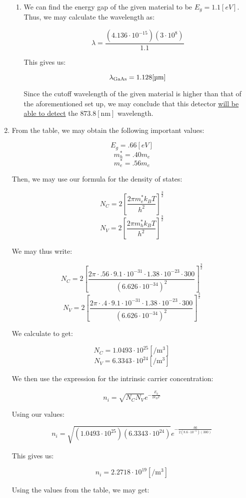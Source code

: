 \begin{enumerate}
\begin{enumerate}
      \item We can find the energy gap of the given material to be $E_g=1.1[\si{eV}]$. Thus, we may calculate the wavelength as:

        $$\lambda=\frac{(4.136\cdot10^{-15})(3\cdot10^{8})}{1.1}$$

        This gives us:

        $$\lambda_{\ce{GaAs}}=1.128[\si{\micro\meter}]$$

        Since the cutoff wavelength of the given material is higher than that of the aforementioned set up, we may conclude that this detector \underline{will be able to detect} the $873.8[\si{\nano\meter}]$ wavelength.

    \end{enumerate}

  \item From the table, we may obtain the following important values:

    $$E_g=.66[\si{eV}]$$
    $$m_h^*=.40m_e$$
    $$m_e^*=.56m_e$$

    Then, we may use our formula for the density of states:

    $$N_C=2\left[\frac{2\pi m_e^*k_BT}{h^2}\right]^{\frac{3}{2}}$$
    $$N_V=2\left[\frac{2\pi m_h^*k_BT}{h^2}\right]^{\frac{3}{2}}$$

    We may thus write:

    $$N_C=2\left[\frac{2\pi \cdot.56\cdot9.1\cdot10^{-31}\cdot 1.38\cdot10^{-23}\cdot300}{(6.626\cdot10^{-34})^2}\right]^{\frac{3}{2}}$$
    $$N_V=2\left[\frac{2\pi \cdot.4\cdot9.1\cdot10^{-31}\cdot 1.38\cdot10^{-23}\cdot300}{(6.626\cdot10^{-34})^2}\right]^{\frac{3}{2}}$$

    We calculate to get:

    $$\boxed{N_C=1.0493\cdot10^{25}\left[ \si{\per\meter\cubed} \right]}$$
    $$\boxed{N_V=6.3343\cdot10^{24}\left[ \si{\per\meter\cubed} \right]}$$

    We then use the expression for the intrinsic carrier concentration:

    $$n_i=\sqrt{N_CN_V}e^{-\frac{E_g}{2k_BT}}$$

    Using our values:

    $$n_i=\sqrt{(1.0493\cdot10^{25})(6.3343\cdot10^{24})}e^{-\frac{.66}{2(8.6\cdot10^{-5})(300)}}$$

    This gives us:

    $$\boxed{n_i=2.2718\cdot10^{19}[\si{\per\meter\cubed}]}$$

    Using the values from the table, we may get:


\end{enumerate}
